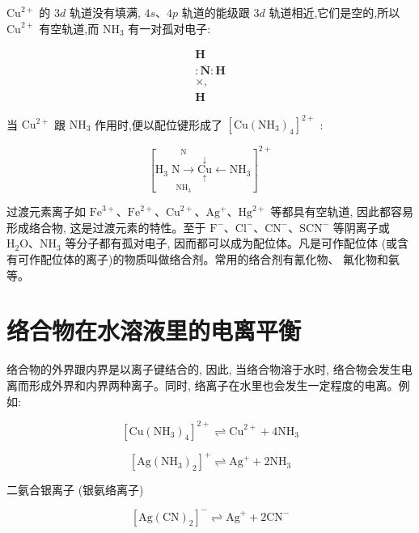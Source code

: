 \documentclass[10pt]{article}
\begin{document}
\({\mathrm{{Cu}}}^{2 + }\) 的 \({3d}\) 轨道没有填满, \({4s}\text{、}{4p}\) 轨道的能级跟 \({3d}\) 轨道相近,它们是空的,所以 \({\mathrm{{Cu}}}^{2 + }\) 有空轨道,而 \({\mathrm{{NH}}}_{3}\) 有一对孤对电子:

\[
\begin{matrix} \mathbf{H} \\ {:\overset{˙}{\mathbf{N}}:\mathbf{H}} \\ { \times ,} \\ \mathbf{H} \end{matrix}
\]

当 \({\mathrm{{Cu}}}^{2 + }\) 跟 \({\mathrm{{NH}}}_{3}\) 作用时,便以配位键形成了 \({\left\lbrack \mathrm{{Cu}}{\left( {\mathrm{{NH}}}_{3}\right) }_{4}\right\rbrack }^{2 + }\) :

\[
{\left\lbrack \underset{{\mathrm{{NH}}}_{3}}{\overset{\mathrm{N}}{{\mathrm{H}}_{3}\mathrm{\;N} \rightarrow \underset{ \uparrow }{\overset{ \downarrow }{\mathrm{{Cu}}}}}} \leftarrow {\mathrm{{NH}}}_{3}\right\rbrack }^{2 + }
\]

过渡元素离子如 \({\mathrm{{Fe}}}^{3 + }\text{、}{\mathrm{{Fe}}}^{2 + }\text{、}{\mathrm{{Cu}}}^{2 + }\text{、}{\mathrm{{Ag}}}^{ + }\text{、}{\mathrm{{Hg}}}^{2 + }\) 等都具有空轨道, 因此都容易形成络合物, 这是过渡元素的特性。至于 \({\mathrm{F}}^{ - }\text{、}{\mathrm{{Cl}}}^{ - }\text{、}{\mathrm{{CN}}}^{ - }\text{、}{\mathrm{{SCN}}}^{ - }\) 等阴离子或 \({\mathrm{H}}_{2}\mathrm{O}\text{、}{\mathrm{{NH}}}_{3}\) 等分子都有孤对电子, 因而都可以成为配位体。凡是可作配位体 (或含有可作配位体的离子)的物质叫做络合剂。常用的络合剂有氰化物、 氟化物和氨等。

\section*{络合物在水溶液里的电离平衡}

络合物的外界跟内界是以离子键结合的, 因此, 当络合物溶于水时, 络合物会发生电离而形成外界和内界两种离子。同时, 络离子在水里也会发生一定程度的电离。例如:

\[
{\left\lbrack \mathrm{{Cu}}{\left( {\mathrm{{NH}}}_{3}\right) }_{4}\right\rbrack }^{2 + } \rightleftharpoons {\mathrm{{Cu}}}^{2 + } + 4{\mathrm{{NH}}}_{3}
\]

\[
{\left\lbrack \mathrm{{Ag}}{\left( {\mathrm{{NH}}}_{3}\right) }_{2}\right\rbrack }^{ + } \rightleftharpoons {\mathrm{{Ag}}}^{ + } + 2{\mathrm{{NH}}}_{3}
\]

二氨合银离子 (银氨络离子)

\[
{\left\lbrack \mathrm{{Ag}}{\left( \mathrm{{CN}}\right) }_{2}\right\rbrack }^{ - } \rightleftharpoons {\mathrm{{Ag}}}^{ + } + 2{\mathrm{{CN}}}^{ - }
\]
\end{document}
